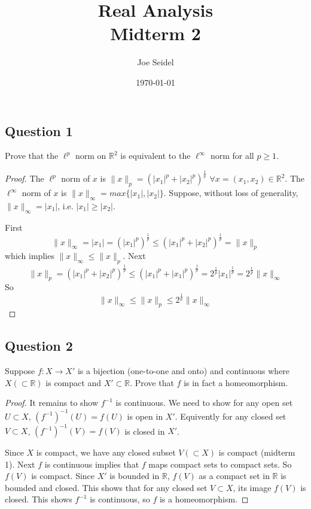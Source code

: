 \documentclass{tufte-book}
\title{Real Analysis\\Midterm 2}
\author{Joe Seidel}
\date{\today}
\theoremstyle{mytheoremstyle}
\theoremstyle{mylemstyle}
\theoremstyle{mydefstyle}
\begin{document}
\maketitle
{}
\newpage
{}

\subsection{Question 1}
Prove that the $\ell^p$ norm on $\mathbb{R}^2$ is equivalent to the $\ell^\infty$ norm for all $p \geq 1$.

\begin{proof}
The $\ell^p$ norm of $x$ is $\|x\|_p = (|x_1|^p + |x_2|^p)^{\frac{1}{p}}$ $\forall x = (x_1,x_2) \in \mathbb{R}^2$.  The $\ell^\infty$ norm of $x$ is $\|x\|_\infty = max\{|x_1|, |x_2|\}$.  Suppose, without loss of generality, $\|x\|_\infty = |x_1|$, i.e. $|x_1| \geq |x_2|$.

First 
\[ \|x\|_\infty = |x_1| = (|x_1|^p)^\frac{1}{p} \leq (|x_1|^p + |x_2|^p)^\frac{1}{p} = \|x\|_p \]
which implies $\|x\|_\infty \leq \|x\|_p$.
Next
\[ \|x\|_p = (|x_1|^p + |x_2|^p)^{\frac{1}{p}} \leq (|x_1|^p + |x_1|^p)^\frac{1}{p} = 2^\frac{1}{p}|x_1|^\frac{1}{p} = 2^\frac{1}{p}\|x\|_\infty \]
So
\[ \|x\|_\infty \leq \|x\|_p \leq 2^\frac{1}{p}\|x\|_\infty \]

\end{proof}

\subsection{Question 2}
Suppose $f: X \to X'$ is a bijection (one-to-one and onto) and continuous where $X(\subset \mathbb{R})$ is compact and $X' \subset \mathbb{R}$.  Prove that $f$ is in fact a homeomorphism.

\begin{proof}
It remains to show $f^{-1}$ is continuous.  We need to show for any open set $U \subset X$, $(f^{-1})^{-1}(U) = f(U)$ is open in $X'$.  Equivently for any closed set $V \subset X$, $(f^{-1})^{-1}(V) = f(V)$  is closed in $X'$.

Since $X$ is compact, we have any closed subset $V(\subset X)$ is compact (midterm 1).  Next $f$ is continuous implies that $f$ maps compact sets to compact sets. So $f(V)$ is compact.  Since $X'$ is bounded in $\mathbb{R}$, $f(V)$ as a compact set in $\mathbb{R}$ is bounded and closed.  This shows that for any closed set $V \subset X$, its image $f(V)$ is closed.  This shows $f^{-1}$ is continuous, so $f$ is a homeomorphism.
\end{proof}
\end{document}
